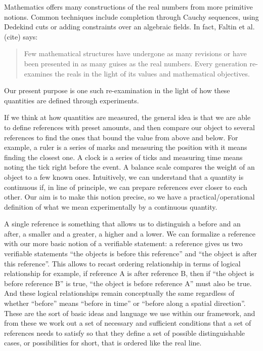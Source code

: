\documentclass[12pt]{iopart}
\begin{document}
Mathematics offers many constructions of the real numbers from more primitive notions. Common techniques include completion through Cauchy sequences, using Dedekind cuts or adding constraints over an algebraic fields. In fact, Faltin et al. (cite) says:
\begin{quote}
Few mathematical structures have undergone as many revisions or have been presented in as many guises as the real numbers. Every generation re-examines the reals in the light of its values and mathematical objectives.
\end{quote}
Our present purpose is one such re-examination in the light of how these quantities are defined through experiments.

If we think at how quantities are measured, the general idea is that we are able to define references with preset amounts, and then compare our object to several references to find the ones that bound the value from above and below. For example, a ruler is a series of marks and measuring the position with it means finding the closest one. A clock is a series of ticks and measuring time means noting the tick right before the event. A balance scale compares the weight of an object to a few known ones. Intuitively, we can understand that a quantity is continuous if, in line of principle, we can prepare references ever closer to each other. Our aim is to make this notion precise, so we have a practical/operational definition of what we mean experimentally by a continuous quantity.

A single reference is something that allows us to distinguish a before and an after, a smaller and a greater, a higher and a lower. We can formalize a reference with our more basic notion of a verifiable statement: a reference gives us two verifiable statements ``the objects is before this reference'' and ``the object is after this reference''. This allows to recast ordering relationship in terms of logical relationship for example, if reference A is after reference B, then if ``the object is before reference B'' is true, ``the object is before reference A'' must also be true. And these logical relationships remain conceptually the same regardless of whether ``before'' means ``before in time'' or ``before along a spatial direction''. These are the sort of basic ideas and language we use within our framework, and from these we work out a set of necessary and sufficient conditions that a set of references needs to satisfy so that they define a set of possible distinguishable cases, or possibilities for short, that is ordered like the real line.
\end{document}
